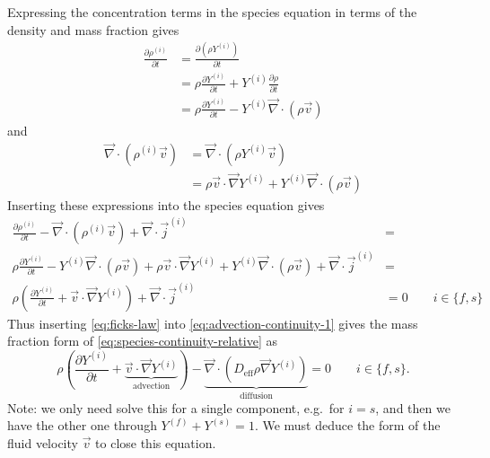 \documentclass[11pt,twoside]{report}
\begin{document}
Expressing the concentration terms in the species equation in terms of the density and mass fraction gives
\begin{align*}
  \frac{\partial \rho^{(i)}}{\partial t} &=
  \frac{\partial (\rho Y^{(i)})}{\partial t} \\
  &=
  \rho \frac{\partial Y^{(i)}}{\partial t} +
  Y^{(i)} \frac{\partial \rho}{\partial t} \\
  &=
  \rho \frac{\partial Y^{(i)}}{\partial t} -
  Y^{(i)} \vec{\nabla} \cdot (\rho \vec{v})
\end{align*}
and
\begin{equation*}
  \begin{aligned}
    \vec{\nabla} \cdot (\rho^{(i)} \vec{v}) &=
    \vec{\nabla} \cdot (\rho Y^{(i)} \vec{v}) \\
    &=
    \rho \vec{v} \cdot \vec{\nabla} Y^{(i)} +
    Y^{(i)} \vec{\nabla} \cdot (\rho \vec{v})
  \end{aligned}
\end{equation*}
Inserting these expressions into the species equation gives
\begin{equation}\label{eq:advection-continuity-1}
  \begin{aligned}
    \frac{\partial \rho^{(i)}}{\partial t} -
    \vec{\nabla} \cdot (\rho^{(i)} \vec{v}) +
    \vec{\nabla} \cdot \vec{j}^{(i)} &= \\
    \rho \frac{\partial Y^{(i)}}{\partial t} -
    Y^{(i)} \vec{\nabla} \cdot (\rho \vec{v}) +
    \rho \vec{v} \cdot \vec{\nabla} Y^{(i)} +
    Y^{(i)} \vec{\nabla} \cdot (\rho \vec{v}) +
    \vec{\nabla} \cdot \vec{j}^{(i)} &= \\
    \rho \left(
    \frac{\partial Y^{(i)}}{\partial t} +
    \vec{v} \cdot \vec{\nabla} Y^{(i)}
    \right) +
    \vec{\nabla} \cdot \vec{j}^{(i)}
    &= 0 \qquad i \in \{f,s\}
  \end{aligned}
\end{equation}
Thus inserting \eqref{eq:ficks-law} into \eqref{eq:advection-continuity-1} gives the mass fraction form of \eqref{eq:species-continuity-relative} as
\begin{equation}\label{eq:mass-fraction-continuity}
  \rho \left(
  \frac{\partial Y^{(i)}}{\partial t} +
  \underbrace{\vec{v} \cdot \vec{\nabla} Y^{(i)}}_\textrm{advection}
  \right)
  -
  \underbrace{\vec{\nabla} \cdot (D_{\textrm{eff}} \rho \vec{\nabla} Y^{(i)})}_\textrm{diffusion}
  = 0
  \qquad i \in \{f,s\}.
\end{equation}
Note: we only need solve this for a single component, e.g.\ for $i=s$, and then we have the other one through $Y^{(f)} + Y^{(s)} = 1$.
We must deduce the form of the fluid velocity $\vec{v}$ to close this equation.
\end{document}
